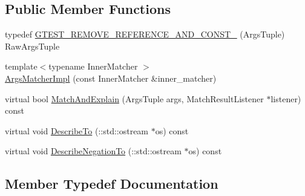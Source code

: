 \subsection*{Public Member Functions}
\begin{DoxyCompactItemize}
\item 
typedef \mbox{\hyperlink{classtesting_1_1internal_1_1ArgsMatcherImpl_a7b0cadc369c0c20cd254cc2052782301}{G\+T\+E\+S\+T\+\_\+\+R\+E\+M\+O\+V\+E\+\_\+\+R\+E\+F\+E\+R\+E\+N\+C\+E\+\_\+\+A\+N\+D\+\_\+\+C\+O\+N\+S\+T\+\_\+}} (Args\+Tuple) Raw\+Args\+Tuple
\item 
{\footnotesize template$<$typename Inner\+Matcher $>$ }\\\mbox{\hyperlink{classtesting_1_1internal_1_1ArgsMatcherImpl_a7f7a9a826d130d11fe30633d79f59a06}{Args\+Matcher\+Impl}} (const Inner\+Matcher \&inner\+\_\+matcher)
\item 
virtual bool \mbox{\hyperlink{classtesting_1_1internal_1_1ArgsMatcherImpl_a60383b3073a61f9d82cbf31fe19e6bfa}{Match\+And\+Explain}} (Args\+Tuple args, Match\+Result\+Listener $\ast$listener) const
\item 
virtual void \mbox{\hyperlink{classtesting_1_1internal_1_1ArgsMatcherImpl_a8e057f67b368f7d94aeb0ddd35837c94}{Describe\+To}} (\+::std\+::ostream $\ast$os) const
\item 
virtual void \mbox{\hyperlink{classtesting_1_1internal_1_1ArgsMatcherImpl_ac8ff5369879836567cedb5434bcca5b9}{Describe\+Negation\+To}} (\+::std\+::ostream $\ast$os) const
\end{DoxyCompactItemize}


\subsection{Member Typedef Documentation}
\mbox{\label{classtesting_1_1internal_1_1ArgsMatcherImpl_ab90d2c074b2072d6c39bf26209fb941f}} 
